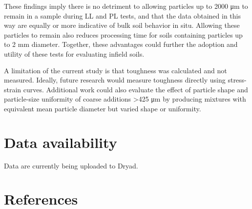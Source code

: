 \documentclass[
  letterpaper,
]{article}
\begin{document}
These findings imply there is no detriment to allowing particles up to 2000 μm to remain in a sample during LL and PL tests, and that the data obtained in this way are equally or more indicative of bulk soil behavior in situ.
Allowing these particles to remain also reduces processing time for soils containing particles up to 2 mm diameter.
Together, these advantages could further the adoption and utility of these tests for evaluating infield soils.

A limitation of the current study is that toughness was calculated and not measured.
Ideally, future research would measure toughness directly using stress-strain curves.
Additional work could also evaluate the effect of particle shape and particle-size uniformity of coarse additions \textgreater425 μm by producing mixtures with equivalent mean particle diameter but varied shape or uniformity.

\hypertarget{data-availability}{%
\section{Data availability}\label{data-availability}}

Data are currently being uploaded to Dryad.

\hypertarget{references}{%
\section*{References}\label{references}}
\end{document}
